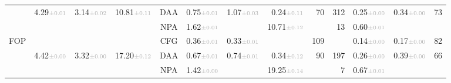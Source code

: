 \begin{table*}
\begin{tabular}{|l|rrr|crrrrr|rrr|}
                     					  &  \multirow{2}{*}{4.29$\mCi{0.01}$} &  \multirow{2}{*}{3.14$\mCi{0.02}$}  &  \multirow{2}{*}{10.81$\mCi{0.11}$}  & DAA      & 0.75$\mCi{0.01}$& 1.07$\mCi{0.03}$&0.24$\mCi{0.11}$ & 70   &312&0.25$\mCi{0.00}$& 0.34$\mCi{0.00}$&  73 \\
                       					  &     													        &        													       && NPA      & 1.62$\mCi{0.01}$& \NAmark     				  &10.71$\mCi{0.12}$  & \NAmark  &13 &  0.60$\mCi{0.01}$ & \NAmark & \NAmarkR   \\
\hline
\multirow{3}{*}{FOP}   & \Tcenter{\intraj}    												     & \Tcenter{JJI}    										&	\TcenterR{\tool{SonarQube}}	& CFG     & 0.36$\mCi{0.01}$ & 0.33$\mCi{0.01}$&\NAmark & 109  &\NAmarkR  & 0.14$\mCi{0.00}$  & 0.17$\mCi{0.00}$ & 82  \\
                      					   &  \multirow{2}{*}{4.42$\mCi{0.00}$}  &  \multirow{2}{*}{3.32$\mCi{0.00}$}  &  \multirow{2}{*}{17.20$\mCi{0.12}$}    & DAA     & 0.67$\mCi{0.01}$ & 0.74$\mCi{0.01}$ & 0.34$\mCi{0.12}$& 90  &197  & 0.26$\mCi{0.00}$  & 0.39$\mCi{0.00}$ & 66 \\
                     					  &          														  &          														  & & NPA      & 1.42$\mCi{0.00}$ & \NAmark      					&19.25$\mCi{0.14}$ & \NAmark  &7 &  0.67$\mCi{0.01}$& \NAmark & \NAmarkR   \\

\hline
\end{tabular}
\end{table*}
